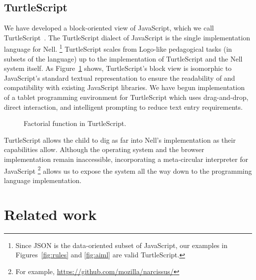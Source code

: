 \documentclass{sig-alternate}
\begin{document}

\subsection{TurtleScript}\label{sec:turtles}

We have developed a block-oriented view of JavaScript, which we call
TurtleScript~\cite{turtlescript}.
The TurtleScript dialect of JavaScript is the single
implementation language for Nell.%
\footnote{Since JSON is the data-oriented subset of JavaScript,
our examples in Figures~\ref{fig:rules} and \ref{fig:aiml} are valid
TurtleScript.} %
TurtleScript scales from Logo-like
pedagogical tasks (in subsets of the language) up to the
implementation of TurtleScript and the
Nell system itself.  As Figure~\ref{fig:turtlescript} shows,
TurtleScript's block view is isomorphic to
JavaScript's standard textual
representation to
ensure the readability of and compatibility with existing JavaScript libraries.
%
We have begun implementation of a
tablet programming environment for TurtleScript which uses
drag-and-drop, direct interaction, and intelligent prompting to reduce
text entry requirements.

\begin{figure}
\centering
{}
\caption{Factorial function in TurtleScript.}\label{fig:turtlescript}
\end{figure}

TurtleScript allows the child to dig as far into Nell's implementation
as their capabilities allow.  Although the operating system and the
browser implementation remain inaccessible, incorporating a
meta-circular interpreter for JavaScript%
\footnote{For example, \url{https://github.com/mozilla/narcissus/}}
allows us to expose the system all the way down to the programming
language implementation.


\section{Related work}\label{sec:related}
\end{document}
